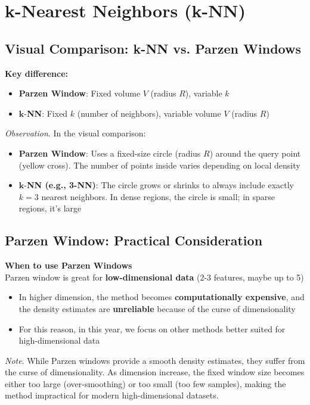 \documentclass[a4paper]{article}
\theoremstyle{definition}
\begin{document}
\section{k-Nearest Neighbors (k-NN)}
\subsection{Visual Comparison: k-NN vs. Parzen Windows}
\begin{tcolorbox}[
    colback=blue!15!white,
    colframe=blue!15!white,
    boxrule=0pt,
    arc=0pt,
    halign=center
]
    \textbf{Key difference:}\\[0.6em]
    \begin{itemize}
        \item \textbf{Parzen Window}: Fixed volume \( V \) (radius \( R \)), variable \( k \)
        \item \( \textbf{k} \)-\textbf{NN}: Fixed \( k \) (number of neighbors), variable volume \( V \) (radius \( R \))
    \end{itemize}
\end{tcolorbox}
\textit{Observation}. In the visual comparison:
\begin{itemize}
    \item \textbf{Parzen Window}: Uses a fixed-size circle (radius \( R \)) around the query point (yellow cross). The number of points inside varies depending on local density 
    \item \( \textbf{k} \)-\textbf{NN (e.g., 3-NN)}: The circle grows or shrinks to always include exactly \( k = 3 \) nearest neighbors. In dense regions, the circle is small; in sparse regions, it's large
\end{itemize}
\subsection{Parzen Window: Practical Consideration}
\begin{tcolorbox}[
    colback=orange!15!white,
    colframe=orange!15!white,
    boxrule=0pt,
    arc=0pt,
    halign=center
]
    \textbf{When to use Parzen Windows}\\[0.6em]
    Parzen window is great for \textbf{low-dimensional data} (2-3 features, maybe up to 5)
\end{tcolorbox}
\begin{itemize}
    \item In higher dimension, the method becomes \textbf{computationally expensive}, and the density estimates are \textbf{unreliable} because of the curse of dimensionality 
    \item For this reason, in this year, we focus on other methods better suited for high-dimensional data
\end{itemize}
\textit{Note}. While Parzen windows provide a smooth density estimates, they suffer from the curse of dimensionality. As dimension increase, the fixed window size 
becomes either too large (over-smoothing) or too small (too few samples), making the method impractical for modern high-dimensional datasets.
\end{document}
